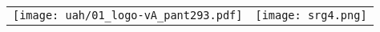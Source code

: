 %
%
%
% 
%
%
%
%

\thispagestyle{empty}

\hspace{-1cm}\begin{tabular}[c]{p{}p{}}
\texttt{[image: uah/01\_logo-vA\_pant293.pdf]} & \texttt{[image: srg4.png]}
\end{tabular}

  \vspace{1cm}

